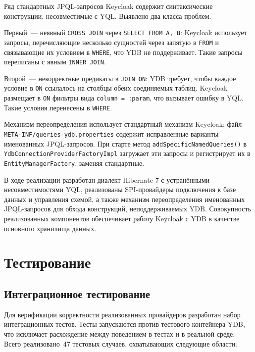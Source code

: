 \documentclass[times]{itmo-student-thesis}
\begin{document}
Ряд стандартных JPQL-запросов Keycloak содержит синтаксические конструкции,
несовместимые с YQL. Выявлено два класса проблем.

Первый~--- неявный \texttt{CROSS JOIN} через \texttt{SELECT FROM A, B}:
Keycloak использует запросы, перечисляющие несколько сущностей через запятую
в \texttt{FROM} и связывающие их условием в \texttt{WHERE}, что YDB не поддерживает.
Такие запросы переписаны с явным \texttt{INNER JOIN}.

Второй~--- некорректные предикаты в \texttt{JOIN ON}: YDB требует,
чтобы каждое условие в \texttt{ON} ссылалось на столбцы обеих соединяемых таблиц.
Keycloak размещает в \texttt{ON} фильтры вида \texttt{column = :param},
что вызывает ошибку в YQL. Такие условия перенесены в \texttt{WHERE}.

Механизм переопределения использует стандартный механизм Keycloak:
файл \texttt{META-INF/queries-ydb.properties} содержит исправленные варианты
именованных JPQL-запросов. При старте метод \texttt{addSpecificNamedQueries()}
в \texttt{Ydb\-Connection\-Provider\-Factory\-Impl} загружает эти запросы
и регистрирует их в \texttt{EntityManagerFactory}, заменяя стандартные.

\chapterconclusion

В ходе реализации разработан диалект Hibernate 7 с устранёнными несовместимостями YQL,
реализованы SPI-провайдеры подключения к базе данных и управления схемой,
а также механизм переопределения именованных JPQL-запросов для обхода конструкций,
неподдерживаемых YDB. Совокупность реализованных компонентов обеспечивает работу
Keycloak с YDB в качестве основного хранилища данных.

\chapter{Тестирование}

\section{Интеграционное тестирование}

Для верификации корректности реализованных провайдеров разработан набор
интеграционных тестов.
Тесты запускаются против тестового контейнера YDB,
что исключает расхождение между поведением в тестах и в реальной среде.
Всего реализовано~47 тестовых случаев, охватывающих следующие области:
\end{document}
